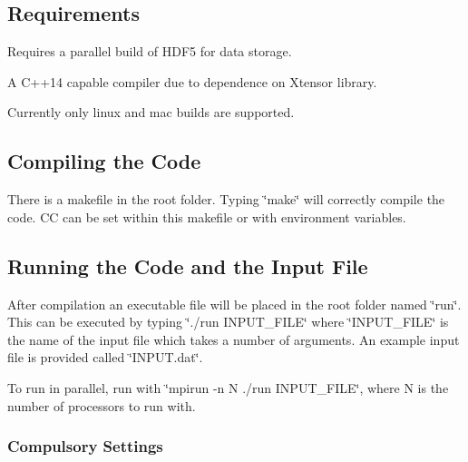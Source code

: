 \href{https://circleci.com/gh/waterswims/NanoMagMC/tree/master}{\tt } \href{http://jmwaters.me/NanoMagMC/}{\tt }

\subsection*{Requirements}


\begin{DoxyItemize}
\item Requires a parallel build of H\+D\+F5 for data storage.
\item A C++14 capable compiler due to dependence on Xtensor library.
\item Currently only linux and mac builds are supported.
\end{DoxyItemize}

\subsection*{Compiling the Code}

There is a makefile in the root folder. Typing \char`\"{}make\char`\"{} will correctly compile the code. CC can be set within this makefile or with environment variables.

\subsection*{Running the Code and the Input File}

After compilation an executable file will be placed in the root folder named \char`\"{}run\char`\"{}. This can be executed by typing \char`\"{}./run I\+N\+P\+U\+T\+\_\+\+F\+I\+L\+E\char`\"{} where \char`\"{}\+I\+N\+P\+U\+T\+\_\+\+F\+I\+L\+E\char`\"{} is the name of the input file which takes a number of arguments. An example input file is provided called \char`\"{}\+I\+N\+P\+U\+T.\+dat\char`\"{}.

To run in parallel, run with \char`\"{}mpirun -\/n N ./run I\+N\+P\+U\+T\+\_\+\+F\+I\+L\+E\char`\"{}, where N is the number of processors to run with.

\subsubsection*{Compulsory Settings}


